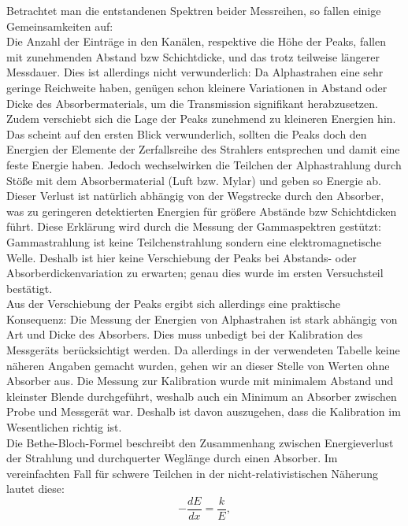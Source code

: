 Betrachtet man die entstandenen Spektren beider Messreihen, so fallen einige Gemeinsamkeiten auf:\\
Die Anzahl der Einträge in den Kanälen, respektive die Höhe der Peaks, fallen mit zunehmenden Abstand bzw Schichtdicke, und das trotz 
teilweise längerer Messdauer. Dies ist allerdings nicht verwunderlich: Da Alphastrahen eine sehr geringe Reichweite haben, genügen schon 
kleinere Variationen in Abstand oder Dicke des Absorbermaterials, um die Transmission signifikant herabzusetzen.\\
Zudem verschiebt sich die Lage der Peaks zunehmend zu kleineren Energien hin. Das scheint auf den ersten Blick verwunderlich, sollten 
die Peaks doch den Energien der Elemente der Zerfallsreihe des Strahlers entsprechen und damit eine feste Energie haben. Jedoch 
wechselwirken die Teilchen der Alphastrahlung durch Stöße mit dem Absorbermaterial (Luft bzw. Mylar) und geben so Energie ab. Dieser 
Verlust ist natürlich abhängig von der Wegstrecke durch den Absorber, was zu geringeren detektierten Energien für größere Abstände 
bzw Schichtdicken führt. Diese Erklärung wird durch die Messung der Gammaspektren gestützt: Gammastrahlung ist keine Teilchenstrahlung 
sondern eine elektromagnetische Welle. Deshalb ist hier keine Verschiebung der Peaks bei Abstands- oder Absorberdickenvariation zu 
erwarten; genau dies wurde im ersten Versuchsteil bestätigt.\\
Aus der Verschiebung der Peaks ergibt sich allerdings eine praktische Konsequenz: Die Messung der Energien von Alphastrahen ist stark 
abhängig von Art und Dicke des Absorbers. Dies muss unbedigt bei der Kalibration des Messgeräts berücksichtigt werden. Da allerdings 
in der verwendeten Tabelle keine näheren Angaben gemacht wurden, gehen wir an dieser Stelle von Werten ohne Absorber aus. Die Messung 
zur Kalibration wurde mit minimalem Abstand und kleinster Blende durchgeführt, weshalb auch ein Minimum an Absorber zwischen Probe 
und Messgerät war. Deshalb ist davon auszugehen, dass die Kalibration im Wesentlichen richtig ist.\\

Die Bethe-Bloch-Formel beschreibt den Zusammenhang zwischen Energieverlust der Strahlung und durchquerter Weglänge durch einen Absorber. 
Im vereinfachten Fall für schwere Teilchen in der nicht-relativistischen Näherung lautet diese: \\

\begin{equation}
    - \frac{dE}{dx} = \frac{k}{E}, 
\end{equation}

